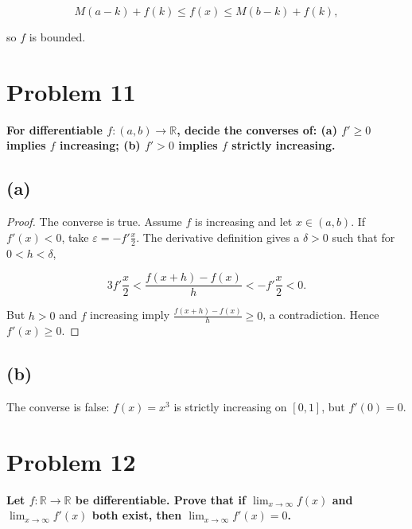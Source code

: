 \[M\left( {a - k} \right) + f(k) \leq f(x) \leq M\left( {b - k} \right) + f(k),\]

so \(f\) is bounded.

\section{Problem 11}

\textbf{For differentiable \(f:\left( {a,b} \right)\rightarrow\mathbb{R}\), decide the converses of: (a) \(f' \geq 0\) implies \(f\) increasing; (b) \(f' > 0\) implies \(f\) strictly increasing.}

\subsection{(a)}

\begin{proof}

The converse is true. Assume \(f\) is increasing and let \(x \in \left( {a,b} \right)\). If \(f'(x) < 0\), take \(\varepsilon = - f'\frac{x}{2}\). The derivative definition gives a \(\delta > 0\) such that for \(0 < h < \delta\),

\[3f'\frac{x}{2} < \frac{f\left( {x + h} \right) - f(x)}{h} < - f'\frac{x}{2} < 0.\]

But \(h > 0\) and \(f\) increasing imply \(\frac{f\left( {x + h} \right) - f(x)}{h} \geq 0\), a contradiction. Hence \(f'(x) \geq 0\).

\end{proof}

\subsection{(b)}

The converse is false: \(f(x) = x^{3}\) is strictly increasing on \(\left\lbrack {0,1} \right\rbrack\), but \(f'(0) = 0\).

\section{Problem 12}

\textbf{Let \(f:\mathbb{R}\rightarrow\mathbb{R}\) be differentiable. Prove that if \(\lim_{x\rightarrow\infty}f(x)\) and \(\lim_{x\rightarrow\infty}f'(x)\) both exist, then \(\lim_{x\rightarrow\infty}f'(x) = 0\).}

